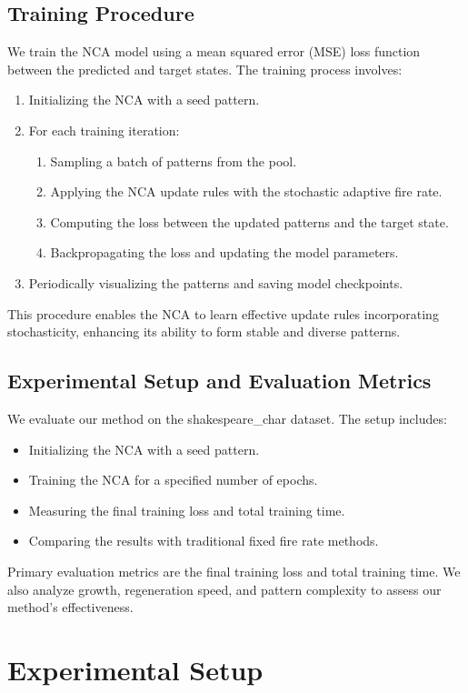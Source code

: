 \documentclass{article} %
\begin{document}
\subsection{Training Procedure}
We train the NCA model using a mean squared error (MSE) loss function between the predicted and target states. The training process involves:
\begin{enumerate}
    \item Initializing the NCA with a seed pattern.
    \item For each training iteration:
    \begin{enumerate}
        \item Sampling a batch of patterns from the pool.
        \item Applying the NCA update rules with the stochastic adaptive fire rate.
        \item Computing the loss between the updated patterns and the target state.
        \item Backpropagating the loss and updating the model parameters.
    \end{enumerate}
    \item Periodically visualizing the patterns and saving model checkpoints.
\end{enumerate}
This procedure enables the NCA to learn effective update rules incorporating stochasticity, enhancing its ability to form stable and diverse patterns.

\subsection{Experimental Setup and Evaluation Metrics}
We evaluate our method on the shakespeare\_char dataset. The setup includes:
\begin{itemize}
    \item Initializing the NCA with a seed pattern.
    \item Training the NCA for a specified number of epochs.
    \item Measuring the final training loss and total training time.
    \item Comparing the results with traditional fixed fire rate methods.
\end{itemize}
Primary evaluation metrics are the final training loss and total training time. We also analyze growth, regeneration speed, and pattern complexity to assess our method's effectiveness.

\section{Experimental Setup}
\label{sec:experimental}
\end{document}
